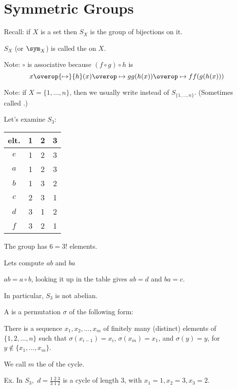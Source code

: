 \documentclass[notes.tex]{subfiles}
\begin{document}
\chapter*{Symmetric Groups}

Recall: if $X$ is a set then $S_X$ is the group of bijections on it.
\begin{definition}
	$S_X$ (or $\sym_X$) is called the  on $X$.
\end{definition}

Note: $\circ$ is associative because $(f\circ g) \circ h$ is $$x\overop{\mapsto}{h}(x)\overop\mapsto{g}g(h(x))\overop\mapsto{f}f(g(h(x)))$$

Note: if $X = \{1, \ldots, n\}$, then we usually write  instead of $S_{\{1, \ldots, n\}}$. (Sometimes called .)

Let's examine $S_3$:

\begin{tabular}{c|ccc}
elt. & 1 & 2 & 3\\\hline
$e$ & 1 & 2 & 3\\
$a$ & 1 & 2 & 3\\
$b$ & 1 & 3 & 2\\
$c$ & 2 & 3 & 1\\
$d$ & 3 & 1 & 2\\
$f$ & 3 & 2 & 1
\end{tabular}

The group has $6 = 3!$ elements.

Lets compute $ab$ and $ba$

$ab = a\circ b$, looking it up in the table gives $ab = d$
 and $ba = c$.

In particular, $S_3$ is not abelian.


\begin{definition}
\label{cycledef}
	A  is a permutation $\sigma$ of the following form:
\end{definition}

There is a sequence $x_1, x_2,\ldots, x_m$ of finitely many (distinct)
elements of $\{1, 2, \ldots, n\}$ such that $\sigma(x_{i-1}) = x_i$, $\sigma(x_m) = x_1$, and $\sigma(y)= y$, for $y\notin \{x_1, \ldots, x_m\}$.

We call $m$ the  of the cycle.

\vspace{0.5em}
Ex. In $S_3,$ $d = \frac{1\;2\;3}{3\;1\;2}$ is a cycle of length 3, with $x_1 =1, x_2=3, x_3=2$.
\end{document}
